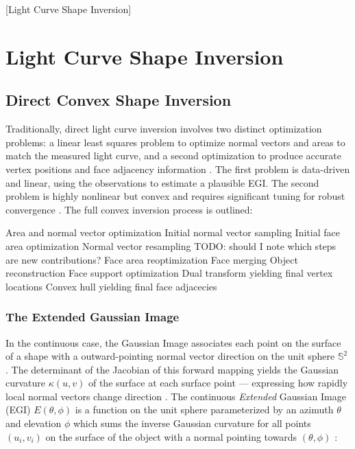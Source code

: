 [Light Curve Shape Inversion]
\graphicspath{{/Users/liamrobinson/Documents/msthesis/static_images/aas_2022_figs}}
\section{Light Curve Shape Inversion}

\subsection{Direct Convex Shape Inversion}

Traditionally, direct light curve inversion involves two distinct optimization problems: a linear least squares problem to optimize normal vectors and areas to match the measured light curve, and a second optimization to produce accurate vertex positions and face adjacency information \cite{fan2020thesis, kaasalainen2000, kaas2001shape, cabrera2021}. The first problem is data-driven and linear, using the observations to estimate a plausible EGI. The second problem is highly nonlinear but convex and requires significant tuning for robust convergence \cite{fan2019}. The full convex inversion process is outlined:

\begin{outline}[enumerate]
  \1 Area and normal vector optimization
    \2 Initial normal vector sampling
    \2 Initial face area optimization
    \2 Normal vector resampling TODO: should I note which steps are new contributions?
    \2 Face area reoptimization
    \2 Face merging
  \1 Object reconstruction
    \2 Face support optimization
    \2 Dual transform yielding final vertex locations
    \2 Convex hull yielding final face adjacecies
\end{outline}

\subsubsection{The Extended Gaussian Image} \label{sec:egi_definition}

In the continuous case, the Gaussian Image associates each point on the surface of a shape with a outward-pointing normal vector direction on the unit sphere $\mathbb{S}^2$ \cite{horn1984}. The determinant of the Jacobian of this forward mapping yields the Gaussian curvature $\kappa(u,v)$ of the surface at each surface point --- expressing how rapidly local normal vectors change direction \cite{horn1984}. The continuous \textit{Extended} Gaussian Image (EGI) $E(\theta, \phi)$ is a function on the unit sphere parameterized by an azimuth $\theta$ and elevation $\phi$ which sums the inverse Gaussian curvature for all points $(u_i, v_i)$ on the surface of the object with a normal pointing towards $(\theta, \phi)$ \cite{horn1984}:


